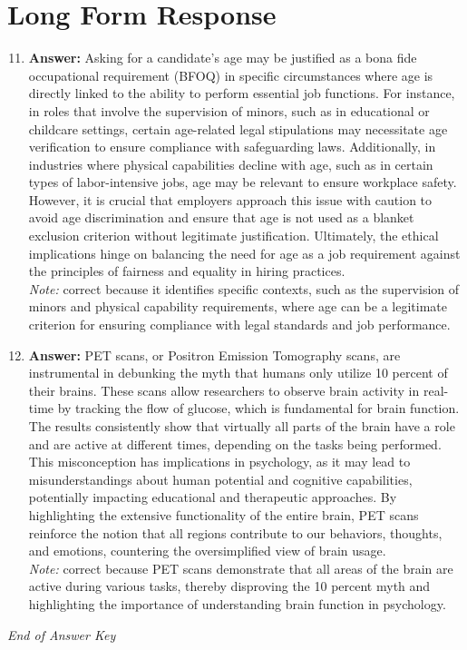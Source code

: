 \documentclass[12pt]{article}
\begin{document}
\section*{Long Form Response}
\begin{enumerate}[label=\arabic*.]
\setcounter{enumi}{10}
\item \textbf{Answer:} Asking for a candidate's age may be justified as a bona fide occupational requirement (BFOQ) in specific circumstances where age is directly linked to the ability to perform essential job functions. For instance, in roles that involve the supervision of minors, such as in educational or childcare settings, certain age-related legal stipulations may necessitate age verification to ensure compliance with safeguarding laws. Additionally, in industries where physical capabilities decline with age, such as in certain types of labor-intensive jobs, age may be relevant to ensure workplace safety. However, it is crucial that employers approach this issue with caution to avoid age discrimination and ensure that age is not used as a blanket exclusion criterion without legitimate justification. Ultimately, the ethical implications hinge on balancing the need for age as a job requirement against the principles of fairness and equality in hiring practices.
\\ \textit{Note:} correct because it identifies specific contexts, such as the supervision of minors and physical capability requirements, where age can be a legitimate criterion for ensuring compliance with legal standards and job performance.
\item \textbf{Answer:} PET scans, or Positron Emission Tomography scans, are instrumental in debunking the myth that humans only utilize 10 percent of their brains. These scans allow researchers to observe brain activity in real-time by tracking the flow of glucose, which is fundamental for brain function. The results consistently show that virtually all parts of the brain have a role and are active at different times, depending on the tasks being performed. This misconception has implications in psychology, as it may lead to misunderstandings about human potential and cognitive capabilities, potentially impacting educational and therapeutic approaches. By highlighting the extensive functionality of the entire brain, PET scans reinforce the notion that all regions contribute to our behaviors, thoughts, and emotions, countering the oversimplified view of brain usage.
\\ \textit{Note:} correct because PET scans demonstrate that all areas of the brain are active during various tasks, thereby disproving the 10 percent myth and highlighting the importance of understanding brain function in psychology.
\end{enumerate}

\vfill
\noindent\textit{End of Answer Key}
\end{document}
